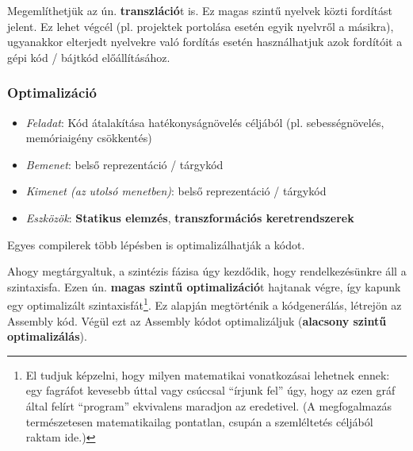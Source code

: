 Megemlíthetjük az ún. \textbf{transzláció}t is. Ez magas szintű nyelvek közti fordítást jelent. Ez lehet végcél (pl. projektek portolása esetén egyik nyelvről a másikra), ugyanakkor elterjedt nyelvekre való fordítás esetén használhatjuk azok fordítóit a gépi kód / bájtkód előállításához.

\subsubsection{Optimalizáció}

\begin{itemize}
	\item \textit{Feladat}: Kód átalakítása hatékonyságnövelés céljából (pl. sebességnövelés, memóriaigény csökkentés)
	\item \textit{Bemenet}: belső reprezentáció / tárgykód
	\item \textit{Kimenet (az utolsó menetben)}: belső reprezentáció / tárgykód
	\item \textit{Eszközök}: \textbf{Statikus elemzés}, \textbf{transzformációs keretrendszerek}
\end{itemize}

Egyes compilerek több lépésben is optimalizálhatják a kódot. 

Ahogy megtárgyaltuk, a szintézis fázisa úgy kezdődik, hogy rendelkezésünkre áll a szintaxisfa. Ezen ún. \textbf{magas szintű optimalizáció}t hajtanak végre, így kapunk egy optimalizált szintaxisfát\footnote{El tudjuk képzelni, hogy milyen matematikai vonatkozásai lehetnek ennek: egy fagráfot kevesebb úttal vagy csúccsal ``írjunk fel'' úgy, hogy az ezen gráf által felírt ``program'' ekvivalens maradjon az eredetivel. (A megfogalmazás természetesen matematikailag pontatlan, csupán a szemléltetés céljából raktam ide.)}. Ez alapján megtörténik a kódgenerálás, létrejön az Assembly kód. Végül ezt az Assembly kódot optimalizáljuk (\textbf{alacsony szintű optimalizálás}).

